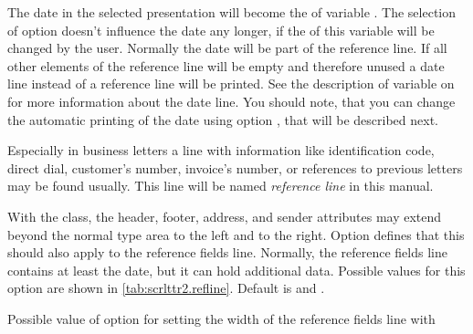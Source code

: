 \begin{Declaration}
\end{Declaration}
%
The date in the selected presentation will become the  of
variable . The selection of option 
doesn't influence the date any longer, if the  of this variable
will be changed by the user. Normally the date will be part of the reference
line. If all other elements of the reference line will be empty and therefore
unused a date line instead of a reference line will be printed. See the
description of variable  on
 for more information about
the date line. You should note, that you can change the automatic printing of
the date using option , that will be described next.
%
%
%


\begin{Declaration}
\end{Declaration}
%
%
%
Especially in business letters a line with information like identification
code, direct dial, customer's number, invoice's
number, or references to previous letters may be found usually. This line will
be named \emph{reference line} in this manual.

With the  class, the header, footer, address, and sender
attributes may extend beyond the normal type area to the left and to the
right. Option  defines that this should also apply to
the reference fields line. Normally, the reference fields line contains at
least the date, but it can hold additional data. Possible values for this
option are shown in \autoref{tab:scrlttr2.refline}. Default is 
and .%
%
\begin{table}
  \caption[{Possible value of option  with
    }]{Possible value of option  for setting
    the width of the reference fields line with
    }
  \label{tab:scrlttr2.refline}
  \begin{desctabular}
  \end{desctabular}
\end{table}

